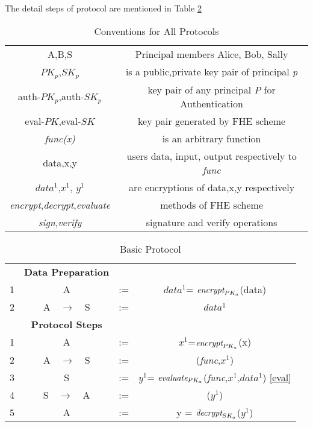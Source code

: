 \documentclass[conference]{IEEEtran}
\numberwithin{equation}{section}
\begin{document}
The detail steps of protocol are mentioned in Table \ref{basicProtocol} 
\begin{table}
\caption {Conventions for All Protocols } 
\label{conventionAll}
\renewcommand{\arraystretch}{2.5}
\begin{center}
\begin{tabular} {|c  c|}
\hline
 {A,B,S} & Principal members Alice, Bob, Sally \\
 {$PK_p$,$SK_p$} & is a public,private key pair of principal \emph{p}\\
 {auth-$PK_p$,auth-$SK_p$} & {key pair of any principal \emph{P} for Authentication} \\
 {eval-$PK$,eval-$SK$} & {key pair generated by FHE scheme} \\
 {\emph{func(x)}} & {is an arbitrary function} \\
 {data,x,y} & {users data, input, output respectively to \emph{func}} \\
 {$data^1$,$x^1$, $y^1$} & {are encryptions of data,x,y respectively} \\
 {\emph{encrypt},\emph{decrypt},\emph{evaluate}} & {methods of FHE scheme} \\
 {\emph{sign},\emph{verify}} & {signature and verify operations} \\
 \hline
\end{tabular}
\end{center}
\end{table}
\begin{table}
\caption{Basic Protocol}
\label{basicProtocol}
\renewcommand{\arraystretch}{2.5}
\begin{center}
\begin{tabular} {| c c c c | }
\hline
&\bf{Data Preparation}&&  \\
{1} & {A} & {:=} & {{$data^1$}= $\emph{encrypt}_{PK_a}$(data)} \\
{2} & {A$\quad \rightarrow \quad$S} & {:=} & {$data^1$} \\
\hline
\hline
&\bf{Protocol Steps}&&\\
{1} &{A} & {:=} & {{$x^1$}=$\emph{encrypt}_{PK_a}$(x)} \\
{2} & {A$\quad \rightarrow \quad$S}&{:=} & { (\emph{func},$x^1$)} \\
{3} & {S}&{:=}&{ {$y^1$}= $\emph{evaluate}_{PK_a}$(\emph{func},$x^1$,$data^1$) \eqref{eval}} \\
{4} & {S$\quad \rightarrow \quad$A}& {:=} & {($y^1$)} \\
{5} & {A}& {:=} & {y =  $\emph{decrypt}_{SK_a}$($y^1$)} \\
\hline
\end{tabular} 
\end{center}
\end{table}
\end{document}
